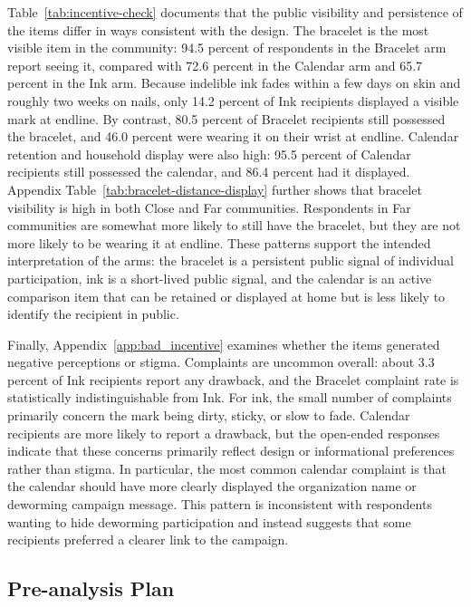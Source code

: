 \documentclass[ECM\space ReStud.tex]{subfiles}
\begin{document}
Table~\ref{tab:incentive-check} documents that the public visibility and persistence of the items differ in ways consistent with the design. The bracelet is the most visible item in the community: 94.5 percent of respondents in the Bracelet arm report seeing it, compared with 72.6 percent in the Calendar arm and 65.7 percent in the Ink arm. Because indelible ink fades within a few days on skin and roughly two weeks on nails, only 14.2 percent of Ink recipients displayed a visible mark at endline. By contrast, 80.5 percent of Bracelet recipients still possessed the bracelet, and 46.0 percent were wearing it on their wrist at endline. Calendar retention and household display were also high: 95.5 percent of Calendar recipients still possessed the calendar, and 86.4 percent had it displayed. Appendix Table~\ref{tab:bracelet-distance-display} further shows that bracelet visibility is high in both Close and Far communities. Respondents in Far communities are somewhat more likely to still have the bracelet, but they are not more likely to be wearing it at endline. These patterns support the intended interpretation of the arms: the bracelet is a persistent public signal of individual participation, ink is a short-lived public signal, and the calendar is an active comparison item that can be retained or displayed at home but is less likely to identify the recipient in public.

Finally, Appendix~\ref{app:bad_incentive} examines whether the items generated negative perceptions or stigma. Complaints are uncommon overall: about 3.3 percent of Ink recipients report any drawback, and the Bracelet complaint rate is statistically indistinguishable from Ink. For ink, the small number of complaints primarily concern the mark being dirty, sticky, or slow to fade. Calendar recipients are more likely to report a drawback, but the open-ended responses indicate that these concerns primarily reflect design or informational preferences rather than stigma. In particular, the most common calendar complaint is that the calendar should have more clearly displayed the organization name or deworming campaign message. This pattern is inconsistent with respondents wanting to hide deworming participation and instead suggests that some recipients preferred a clearer link to the campaign.


\subsection{Pre-analysis Plan}\label{sec:prereg}
\end{document}
